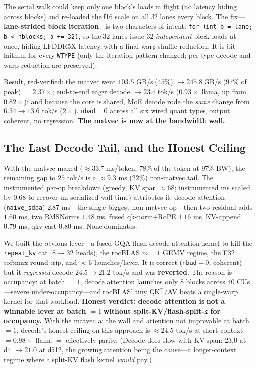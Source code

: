 \documentclass[11pt]{article}
\begin{document}
The serial walk could keep only one block's loads in flight (no latency hiding across blocks) and re-loaded the f16 scale on all $32$ lanes every block. The fix---\textbf{lane-strided block iteration}---is two characters of intent: \texttt{for (int b = lane; b < nblocks; b += 32)}, so the $32$ lanes issue $32$ \emph{independent} block loads at once, hiding LPDDR5X latency, with a final warp-shuffle reduction. It is bit-faithful for every \texttt{WTYPE} (only the iteration pattern changed; per-type decode and warp reduction are preserved).

Result, red-verified: the matvec went $103.5$ GB/s ($45\%$) $\to 245.8$ GB/s ($97\%$ of peak) $=2.37\times$; end-to-end eager decode $\to 23.4$ tok/s ($0.93\times$ llama, up from $0.82\times$); and because the core is shared, MoE decode rode the \emph{same} change from $6.34 \to 13.6$ tok/s ($2\times$). \texttt{nbad}$=0$ across all six wired quant types, output coherent, no regression. \textbf{The matvec is now at the bandwidth wall.}

\subsection{The Last Decode Tail, and the Honest Ceiling}

With the matvec maxed ($\approx 33.7$ ms/token, $78\%$ of the token at $97\%$ BW), the remaining gap to $25$ tok/s is a $\approx 9.3$ ms ($22\%$) non-matvec tail. The instrumented per-op breakdown (greedy, KV span $\approx 68$; instrumented ms scaled by $0.68$ to recover un-serialized wall time) attributes it: decode attention (\texttt{naive\_sdpa}) $2.87$ ms---the single biggest non-matvec op---then two residual adds $1.60$ ms, two RMSNorms $1.48$ ms, fused qk-norm$+$RoPE $1.16$ ms, KV-append $0.79$ ms, qkv cast $0.80$ ms. None dominates.

We built the obvious lever---a fused GQA flash-decode attention kernel to kill the \texttt{repeat\_kv} cat ($8\to 32$ heads), the rocBLAS $m{=}1$ GEMV regime, the F32 softmax round-trip, and $\approx 5$ launches/layer. It is correct (\texttt{nbad}$=0$, coherent) but it \emph{regressed} decode $24.5 \to 21.2$ tok/s and was \textbf{reverted}. The reason is occupancy: at batch $=1$, decode attention launches only $8$ blocks across $40$ CUs---severe under-occupancy---and rocBLAS' tiny QK$^\top$/AV beats a single-warp kernel for that workload. \textbf{Honest verdict: decode attention is not a winnable lever at batch $=1$ without split-KV/flash-split-k for occupancy.} With the matvec at the wall and attention not improvable at batch $=1$, decode's honest ceiling on this approach is $\approx 24.5$ tok/s at short context $=0.98\times$ llama $=$ effectively parity. (Decode does slow with KV span: $23.0$ at d4 $\to 21.0$ at d512, the growing attention being the cause---a longer-context regime where a split-KV flash kernel \emph{would} pay.)
\end{document}
